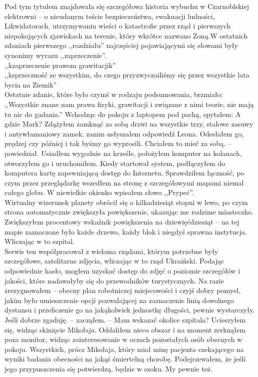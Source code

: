 \documentclass[../MAIN.tex]{subfiles}
\begin{document}
Pod tym tytułem znajdowała się szczegółowa historia wybuchu w Czarnoblskiej elektrowni -- o nieudanym teście bezpieczeństwa, ewakuacji ludności, Likwidatorach, utrzymywaniu wieści o katastrofie przez rząd i pierwszych niepokojących zjawiskach na terenie, który wkrótce nazwano Zoną.W ostatnich zdaniach pierwszego ,,rozdziału'' najczęściej pojawiającymi się słowami były synonimy wyrazu ,,zaprzeczenie''.
\\
,,\3kzaprzeczenie prawom grawitacji\3k''
\\
,,\3ksprzeczność ze wszystkim, do czego przyzwyczailiśmy się przez wszystkie lata bycia na Ziemi\3k''
\\
Ostatnie zdanie, które było czymś w rodzaju podsumowania, brzmiało:
\\
,,Wszystkie znane nam prawa fizyki, grawitacji i związane z nimi teorie, nie mają tu nic do gadania.''
%
%
Wchodząc do pokoju z laptopem pod pachą, spytałem:
\sx A gdzie Mark? \qd
Zdążyłem zamknąć za sobą drzwi na wszystkie trzy, stalowe zasuwy i antywłamaniowy zamek, zanim usłyszałem odpowiedź Leona.
\sx Odesłałem go, prędzej czy później i tak byśmy go wyprosili. Chciałem to mieć za sobą. -- powiedział.
\qd
Usiadłem wygodnie na krześle, położyłem komputer na kolanach, otworzyłem go i uruchomiłem. Kiedy startował system, podłączyłem do komputera kartę zapewniającą dostęp do Internetu. Sprawdziłem łączność, po czym przez przeglądarkę wszedłem na stronę z szczegółowymi mapami niemal całego globu. W niewielkie okienko wpisałem słowo ,,Prypeć''.
\\
Wirtualny wizerunek planety obrócił się o kilkadziesiąt stopni w lewo, po czym strona automatycznie zwiększyła powiększenie, ukazując me rodzime miasteczko. Zwiększyłem procentowy wskaźnik powiększenia na dziewięćdziesiąt -- na tej mapie zaznaczone było każde drzewo, każdy blok i niegdyś sprawna instytucja. Wliczając w to szpital.
\\
Serwis ten współpracował z wieloma rządami, którym potrzebne były szczegółowe, satelitarne zdjęcia, wliczając w to rząd Ukraiński. Podając odpowiednie hasło, mogłem uzyskać dostęp do zdjęć o poziomie szczegółów i jakości, które nadawałyby się do przewodników turystycznych. Na razie zrezygnowałem -- obecny plan robotniczej miejscowości i czyjś dobry pomysł, jakim było umieszczenie opcji pozwalającej na zaznaczenie linią dowolnego dystansu i przeliczenie go na jakąkolwiek jednostkę długości, pewnie wystarczyły.
\sx Jeśli dobrze zgaduję. -- zacząłem. -- Mam wskazać okolice szpitala?
\qd
Ucieszyłem się, widząc skinięcie Mikołaja. Oddaliłem nieco obszar i na moment zerknąłem poza monitor, widząc zainteresowanie w oczach pozostałych osób obecnych w pokoju. Wszystkich, prócz Mikołaja, który miał minę pacjenta czekającego na wyniki badania obecności na jakąś śmiertelną chorobę. Podejrzewałem, że jeśli jego przypuszczenia się potwierdzą, będzie w szoku. My pewnie też.
\end{document}
